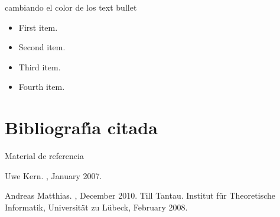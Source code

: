 \documentclass[]{beamer}
\theoremstyle{plain}
\begin{document}
\begin{frame}{cambiando el color de los text bullet}
  \begin{itemize}
    \item First item.
    \item Second item.
    \item Third item.
    \item Fourth item.
  \end{itemize}

\end{frame}

\section{Bibliograf\'{\i}a citada}
\begin{frame}{Material de referencia }

  \begin{thebibliography}{10}

    Uwe Kern.
    , January 2007.

    Andreas Matthias.
    , December 2010.
    Till Tantau.
    \newblock Institut f\"{u}r Theoretische Informatik, Universit\"{a}t zu
      L\"{u}beck, February 2008.



  \end{thebibliography}

\end{frame}
\end{document}
